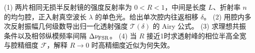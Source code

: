 (1) 两片相同无损半反射镜的强度反射率为 \(0<R<1\)，中间是长度 \(L\)、折射率 \(n\) 的均匀腔，正入射真空波长 \(\lambda\) 的单色光。给出单次腔内往返相移 \(\delta\)。
(2) 用腔内多次反射振幅几何级数导出归一化透射强度 \(\mathcal T(\delta)\) 的 Airy 公式。
(3) 求理想共振条件以及相邻纵模频率间隔 \(\Delta\nu_{\rm FSR}\)。
(4) 当 \(R\) 接近1时求透射峰的相位半高全宽与腔精细度 \(\mathcal F\)，解释 \(R\to0\) 时高精细度近似为何失效。
